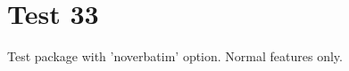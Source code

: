 \documentclass[12pt]{report}
\begin{document}
\chapter{Test 33}
Test package with 'noverbatim' option. Normal features only.

\svnrev
\svndate
\svnauthor
\svnyear
\svnmonth
\svnday
\svnhour
\svnminute
\svnsecond
\svntimezone
\svntimezonehour
\svntimezoneminute

\svntoday
\end{document}
